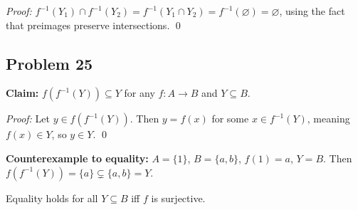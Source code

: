 \emph{Proof:} $f^{-1}(Y_1)\cap f^{-1}(Y_2)=f^{-1}(Y_1\cap Y_2)=f^{-1}(\varnothing)=\varnothing$, using the fact that preimages preserve intersections. \qed

\subsection*{Problem 25}
\textbf{Claim:} $f(f^{-1}(Y))\subseteq Y$ for any $f:A\to B$ and $Y\subseteq B$.

\emph{Proof:} Let $y\in f(f^{-1}(Y))$. Then $y=f(x)$ for some $x\in f^{-1}(Y)$, meaning $f(x)\in Y$, so $y\in Y$. \qed

\textbf{Counterexample to equality:} $A=\{1\}$, $B=\{a,b\}$, $f(1)=a$, $Y=B$. Then $f(f^{-1}(Y))=\{a\}\subsetneq\{a,b\}=Y$.

Equality holds for all $Y\subseteq B$ iff $f$ is surjective.
